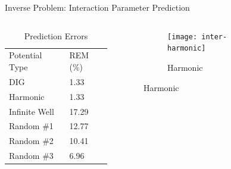 \documentclass{beamer}
\begin{document}
\begin{frame}{Inverse Problem: Interaction Parameter Prediction}
    \begin{columns}
        \begin{column}{0.4\textwidth}
            \begin{table}[]
                \centering
                \caption{Prediction Errors}
                \begin{tabular}{ll}
                    Potential Type & REM (\%) \\
                    DIG            & 1.33     \\
                    Harmonic       & 1.33     \\
                    Infinite Well  & 17.29    \\
                    Random \#1     & 12.77    \\
                    Random \#2     & 10.41    \\
                    Random \#3     & 6.96                    
                \end{tabular}
            \end{table}
        \end{column}
        \begin{column}{0.8\textwidth}
        \graphicspath{{"../figs/training/interaction/"}}
        \begin{figure}[H]
            \begin{subfigure}[t]{0.80\textwidth}
                \texttt{[image: inter-harmonic]}
            \caption{Harmonic}
            \end{subfigure}
        \end{figure}
        \end{column}
    \end{columns}
\end{frame}
\end{document}
